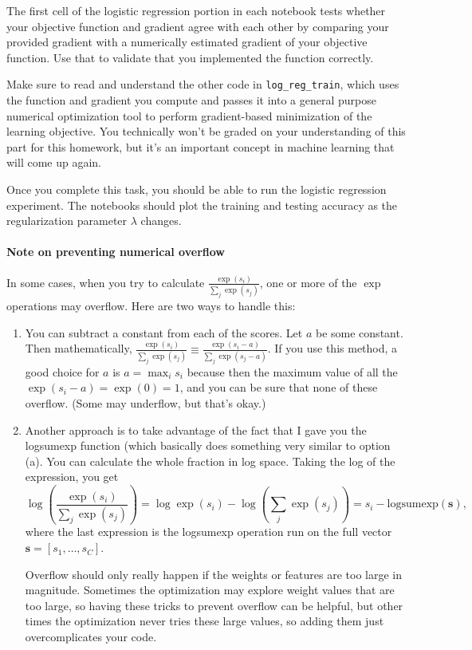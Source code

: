 \documentclass[10pt]{article}
\begin{document}
\begin{enumerate}
The first cell of the logistic regression portion in each notebook tests whether your objective function and gradient agree with each other by comparing your provided gradient with a numerically estimated gradient of your objective function. Use that to validate that you implemented the function correctly. 

Make sure to read and understand the other code in \texttt{log\_reg\_train}, which uses the function and gradient you compute and passes it into a general purpose numerical optimization tool to perform gradient-based minimization of the learning objective. You technically won't be graded on your understanding of this part for this homework, but it's an important concept in machine learning that will come up again.

Once you complete this task, you should be able to run the logistic regression experiment. The notebooks should plot the training and testing accuracy as the regularization parameter $\lambda$ changes. 

\paragraph{Note on preventing numerical overflow} 

In some cases, when you try to calculate 
$\frac{\exp(s_i)}{\sum_{j} \exp(s_j)}$,
one or more of the $\exp$ operations may overflow. Here are two ways to handle this:

\begin{enumerate}

\item You can subtract a constant from each of the scores. Let $a$ be some constant. Then mathematically, $\frac{\exp(s_i)}{\sum_j \exp(s_j)} \equiv \frac{\exp(s_i - a)}{\sum_j \exp(s_j - a)}$. If you use this method, a good choice for $a$ is $a = \max_i s_i$ because then the maximum value of all the 
$\exp(s_i - a) = \exp(0) = 1$,
and you can be sure that none of these overflow. (Some may underflow, but that's okay.)

\item Another approach is to take advantage of the fact that I gave you the logsumexp function (which basically does something very similar to option (a). You can calculate the whole fraction in log space. Taking the log of the expression, you get 
\[
\log \left( \frac{\exp(s_i)}{\sum_j \exp(s_j)} \right) = \log \exp(s_i) - \log \left(\sum_j \exp(s_j)\right) = s_i - \textrm{logsumexp}({\boldsymbol s}),
\] 
where the last expression is the logsumexp operation run on the full vector ${\boldsymbol s} = [	s_1, \ldots, s_C]$.

Overflow should only really happen if the weights or features are too large in magnitude. Sometimes the optimization may explore weight values that are too large, so having these tricks to prevent overflow can be helpful, but other times the optimization never tries these large values, so adding them just overcomplicates your code.
\end{enumerate}

\end{enumerate}
\end{document}
